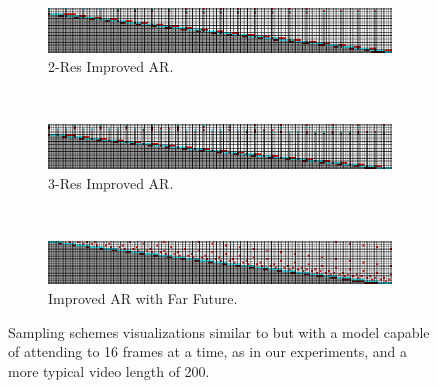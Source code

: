 \begin{figure}[t!]
\begin{subfigure}[t]{\textwidth}
    \end{subfigure}
    ~
    \begin{subfigure}[t]{\textwidth}
        \centering
        \includegraphics[width=\textwidth]{figures/big-sampling-scheme-visualizations/autoregressive-multires-10-1.png}
        \caption{2-Res Improved AR.}
        \label{fig:2res-app}
    \end{subfigure}
    ~
    \begin{subfigure}[t]{\textwidth}
        \centering
        \includegraphics[width=\textwidth]{figures/big-sampling-scheme-visualizations/autoregressive-multires-15-5-1.png}
        \caption{3-Res Improved AR.}
        \label{fig:3res-app}
    \end{subfigure}
    ~
    \begin{subfigure}[t]{\textwidth}
        \centering
        \includegraphics[width=\textwidth]{figures/big-sampling-scheme-visualizations/autoregressive-with-future.png}
        \caption{Improved AR with Far Future.}
    \end{subfigure}
    \caption[A visualization of all sampling schemes.]{Sampling schemes visualizations similar to  but with a model capable of attending to 16 frames at a time, as in our experiments, and a more typical video length of 200.
    }
    \label{fig:sampling-scheme-details}
\end{figure}